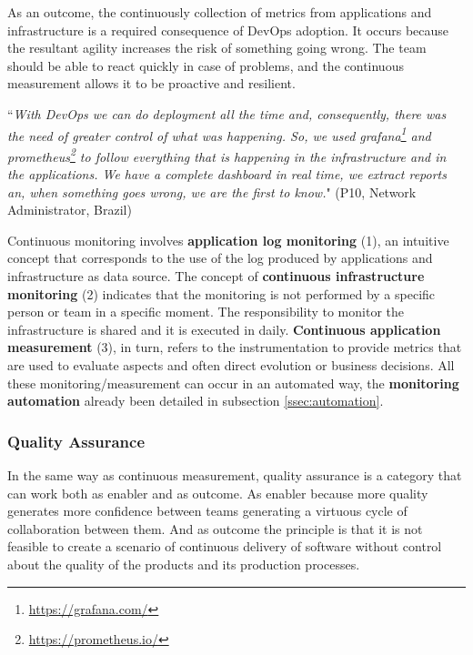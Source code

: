 As an outcome, the continuously collection of metrics from applications and
infrastructure is a required consequence of DevOps adoption. It occurs because
the resultant agility increases the risk of something going wrong. The team
should be able to react quickly in case of problems, and the continuous
measurement allows it to be proactive and resilient.

\begin{mq}
``\emph{With DevOps we can do deployment all the time and, consequently, there was
the need of greater control of what was happening. So, we used
grafana\footnote{\url{https://grafana.com/}} and
prometheus\footnote{\url{https://prometheus.io/}} to follow everything that is
happening in the infrastructure and in the applications. We have a complete
dashboard in real time, we extract reports an, when something goes wrong, we
are the first to know.}" (P10, Network Administrator, Brazil)
\end{mq}

Continuous monitoring involves \textbf{application log monitoring} (1), an
intuitive concept that corresponds to the use of the log produced by
applications and infrastructure as data source. The concept of
\textbf{continuous infrastructure monitoring} (2) indicates that the monitoring
is not performed by a specific person or team in a specific moment. The
responsibility to monitor the infrastructure is shared and it is executed in
daily. \textbf{Continuous application measurement} (3), in turn, refers to
the instrumentation to provide metrics that are used to evaluate aspects and
often direct evolution or business decisions. All these monitoring/measurement
can occur in an automated way, the \textbf{monitoring automation} already been
detailed in subsection \ref{ssec:automation}.

\subsubsection*{{\bf Quality Assurance}}

In the same way as continuous measurement, quality assurance is a category that
can work both as enabler and as outcome. As enabler because more quality
generates more confidence between teams generating a virtuous cycle of
collaboration between them. And as outcome the principle is that it is not
feasible to create a scenario of continuous delivery of software without control
about the quality of the products and its production processes.

